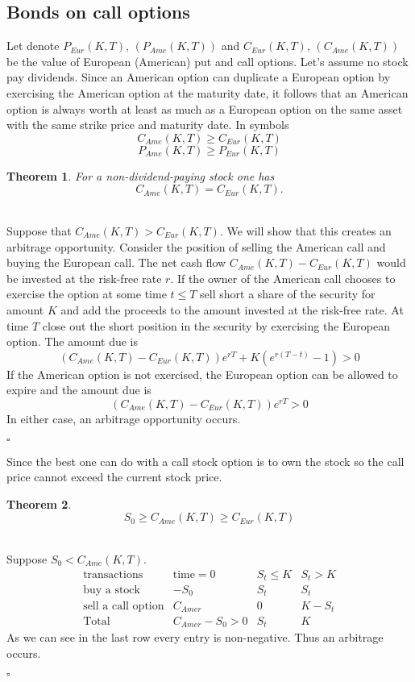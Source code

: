 \documentclass{book}
\newtheorem{theorem}{Theorem}[section]
\newenvironment{proof}
{{\bf Proof. }}{\begin{flushright}$\square$\end{flushright}}
\begin{document}
\subsection{Bonds on call options}
Let denote $P_{Eur}(K,T)$, $(P_{Ame}(K,T))$ and $C_{Eur}(K,T)$, $(C_{Ame}(K,T))$ be the value of European (American) put and call options. Let's assume no stock pay dividends. Since an American option can duplicate a European option by exercising the American option at the maturity date, it follows that an American option is always worth at least as much as a European option on the same asset with the same strike price and maturity date. In symbols
$$
C_{Ame}(K,T)\geq C_{Eur}(K,T)
$$
$$
P_{Ame}(K,T)\geq P_{Eur}(K,T)
$$
\begin{theorem}
For a non-dividend-paying stock one has
$$
C_{Ame}(K,T)=C_{Eur}(K,T).
$$
\end{theorem}
\begin{proof}\\
Suppose that $C_{Ame}(K,T)> C_{Eur}(K,T)$. We will show that this creates an
arbitrage opportunity. Consider the position of selling the American call and
buying the European call. The net cash flow $C_{Ame}(K,T)-C_{Eur}(K,T)$ would
be invested at the risk-free rate $r$. If the owner of the American call chooses to exercise the option at some time $t\leq T$ sell short a share of the security for amount $K$ and add the proceeds to the amount invested at the risk-free rate. At time $T$ close out the short
position in the security by exercising the European option. The amount due is
$$
(C_{Ame}(K,T)-C_{Eur}(K,T))e^{rT}+K(e^{r(T-t)}-1)>0
$$
If the American option is not exercised, the European option can be allowed
to expire and the amount due is
$$
(C_{Ame}(K,T)-C_{Eur}(K,T))e^{rT}>0
$$
In either case, an arbitrage opportunity occurs.
\end{proof}
Since the best one can do with a call stock option is to own the stock so the call price cannot exceed the current stock price. 
\begin{theorem}
$$
S_{0}\geq C_{Ame}(K,T)\geq C_{Eur}(K,T)
$$
\end{theorem}
\begin{proof}\\
Suppose $S_{0}< C_{Ame}(K,T)$. 
$$
\begin{array}{l|l|l|l|}

\text{transactions} & \text{time}=0 & S_{t}\leq K & S_{t}>K\\
\hline
\hline
\text{buy a stock} & -S_{0} & S_{t} & S_{t}\\
\hline
\text{sell a call option}& C_{Amer}&0&K-S_{t}\\
\hline
\text{Total}&C_{Amer}-S_{0}>0&S_{t}&K
\end{array}
$$
As we can see in the last row every entry is non-negative. Thus an arbitrage occurs.
\end{proof}
\end{document}
